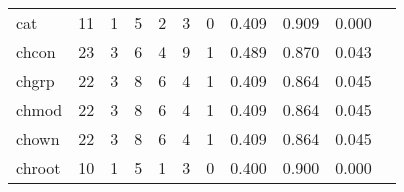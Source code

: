 \begin{longtable}{lp{1.2cm}p{1.2cm}p{1.2cm}p{1.2cm}p{1.2cm}p{1.2cm}p{1.2cm}p{1.2cm}p{1.2cm}p{1.2cm}}
cat       &                                    11 &                                                  1 &                                                  5 &                                                  2 &                                                  3 &                                                  0 &                                         0.409 &                                              0.909 &                                              0.000 \\
chcon     &                                    23 &                                                  3 &                                                  6 &                                                  4 &                                                  9 &                                                  1 &                                         0.489 &                                              0.870 &                                              0.043 \\
chgrp     &                                    22 &                                                  3 &                                                  8 &                                                  6 &                                                  4 &                                                  1 &                                         0.409 &                                              0.864 &                                              0.045 \\
chmod     &                                    22 &                                                  3 &                                                  8 &                                                  6 &                                                  4 &                                                  1 &                                         0.409 &                                              0.864 &                                              0.045 \\
chown     &                                    22 &                                                  3 &                                                  8 &                                                  6 &                                                  4 &                                                  1 &                                         0.409 &                                              0.864 &                                              0.045 \\
chroot    &                                    10 &                                                  1 &                                                  5 &                                                  1 &                                                  3 &                                                  0 &                                         0.400 &                                              0.900 &                                              0.000 \\

\end{longtable}
